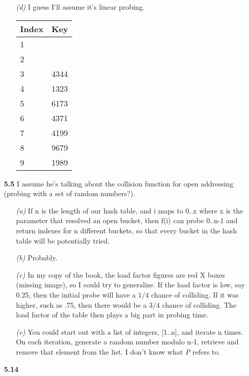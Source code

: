 \documentclass{article}
\begin{document}
\begin{enumerate}
\begin{enumerate}
	\item[\emph{(d)}]
	I guess I'll assume it's linear probing.
	\begin{tabular}[t]{l | l}
	\textbf{Index} & \textbf{Key} \\ \hline
	1 &  \\
	2 &  \\
	3 & 4344 \\
	4 & 1323 \\
	5 & 6173 \\
	6 & 4371 \\
	7 & 4199 \\
	8 & 9679 \\
	9 & 1989 
	\end{tabular}

	\end{enumerate}

\item[\textbf{5.5}]
I assume he's talking about the collision function for open addressing (probing
with a set of random numbers?).

	\begin{enumerate}
	\item[\emph{(a)}]
	If n is the length of our hash table, and i maps to 0..x where x is the
	parameter that resolved an open bucket, then f(i) can probe 0..n-1 and return
	indexes for n different buckets, so that every bucket in the hash table will
	be potentially tried. 

	\item[\emph{(b)}]
	Probably.

	\item[\emph{(c)}]
	In my copy of the book, the load factor figures are red X boxes (missing
	image), so I could try to generalize. If the load factor is low, say 0.25,
	then the initial probe will have a $1/4$ chance of colliding. If it was
	higher, such as .75, then there would be a $3/4$ chance of colliding. The
	load factor of the table then plays a big part in probing time.

	\item[\emph{(e)}]
	You could start out with a list of integers, [1..n], and iterate n times. On
	each iteration, generate a random number modulo n-1, retrieve and remove that
	element from the list. I don't know what \emph{P} refers to.

	\end{enumerate}

\item[\textbf{5.14}]


\end{enumerate}
\end{document}
